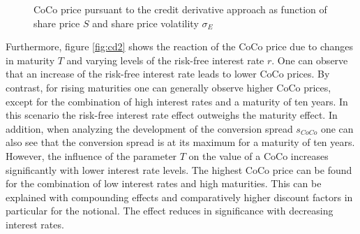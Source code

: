 \begin{figure}
\centering
{}
  \caption[CoCo price pursuant to the credit derivative approach as function of share price and share price volatility]{CoCo price pursuant to the credit derivative approach as function of share price $S$ and share price volatility $\sigma_E$}
  \label{fig:cd1}
  \end{figure}

Furthermore, figure \ref{fig:cd2} shows the reaction of the CoCo price due to changes in maturity $T$ and varying levels of the risk-free interest rate $r$. One can observe that an increase of the risk-free interest rate leads to lower CoCo prices. By contrast, for rising maturities one can generally observe higher CoCo prices, except for the combination of high interest rates and a maturity of ten years. In this scenario the risk-free interest rate effect outweighs the maturity effect. In addition, when analyzing the development of the conversion spread $s_{CoCo}$ one can also see that the conversion spread is at its maximum for a maturity of ten years. However, the influence of the parameter $T$ on the value of a CoCo increases significantly with lower interest rate levels. The highest CoCo price can be found for the combination of low interest rates and high maturities. This can be explained with compounding effects and comparatively higher discount factors in particular for the notional. The effect reduces in significance with decreasing interest rates.  
  
